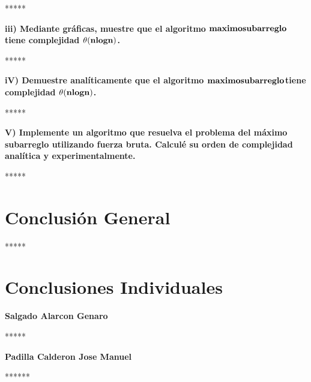 \documentclass[spanish]{article}
\begin{document}
	\bigskip
	
	*****

	\bigskip

	{\large{\bf iii) Mediante gráficas, muestre que el algoritmo  ${\bf maximo subarreglo }$ tiene complejidad ${\bf \theta(nlogn)}$.}}\\
	
	\bigskip
	
	*****

	\bigskip

	{\large{\bf iV) Demuestre  analíticamente que el algoritmo  ${\bf maximo subarreglo }$tiene complejidad ${\bf \theta(nlogn)}$.}}
	
	\bigskip
	
	*****

	\bigskip

	{\large{\bf V) Implemente un algoritmo que resuelva el problema del máximo subarreglo utilizando fuerza bruta. Calculé su orden de complejidad analítica y experimentalmente.}}\\
	
	\bigskip
	
	*****

	\bigskip

	\newpage

	\bigskip

	\section{Conclusi\'on General}

	\bigskip

	*****

	\bigskip

	\section{Conclusiones Individuales}

	\bigskip

	{\large{\bf Salgado Alarcon Genaro}}\\

	\bigskip

	*****

	\bigskip

	{\large{\bf Padilla Calderon Jose Manuel}}\\
	
	\bigskip

	******	

	\bigskip

	\newpage
\end{document}
